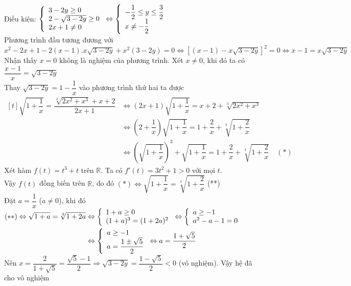 \lgi 
 Điều kiện: $\left\{\begin{array}{ll}3-2y\ge 0 \\ 2-\sqrt{3-2y}\ge 0 \\ 2x+1 \ne 0\end{array}\right. \Leftrightarrow \left\{\begin{array}{ll}-\dfrac{1}{2}\le y \le \dfrac{3}{2} \\ x\ne  -\dfrac{1}{2}\end{array}\right.$\\
 Phương trình đầu tương đương với\\
 $ x^2-2x+1-2(x-1).x\sqrt{3-2y}+x^2(3-2y)=0 \Leftrightarrow \left[(x-1)-x\sqrt{3-2y} \right]^2=0 \Leftrightarrow x-1=x\sqrt{3-2y} $\\
 Nhận thấy $x=0$ không là nghiệm của phương trình. Xét $x\ne 0$, khi đó ta có $\dfrac{x-1}{x}=\sqrt{3-2y}$\\
 Thay $\sqrt{3-2y}=1-\dfrac{1}{x}$ vào phương trình thứ hai ta được\\
$\begin{aligned}[t]\sqrt{1+\dfrac{1}{x}}=\dfrac{\sqrt[3]{2x^2+x^3}+x+2}{2x+1} &\Leftrightarrow (2x+1)\sqrt{1+\dfrac{1}{x}}=x+2+\sqrt[3]{2x^2+x^3} \\
&\Leftrightarrow \left(2+\dfrac{1}{x} \right)\sqrt{1+\dfrac{1}{x}}=1+\dfrac{2}{x}+\sqrt[3]{1+\dfrac{2}{x}} \\
&\Leftrightarrow \left(\sqrt{1+\dfrac{1}{x}} \right)^3+\sqrt{1+\dfrac{1}{x}}=1+\dfrac{2}{x}+\sqrt[3]{1+\dfrac{2}{x}} \quad (*)
\end{aligned}$\\
Xét hàm $f(t)=t^3+t$ trên $\mathbb{R}$. Ta có $f'(t)=3t^2+1>0$ với mọi $t$.\\
 Vậy $f(t)$ đồng biến trên $\mathbb{R}$, do đó $(*)\Leftrightarrow \sqrt{1+\dfrac{1}{x}}=\sqrt[3]{1+\dfrac{2}{x}}$ (**)\\
 Đặt $a=\dfrac{1}{x}$ ($a\ne 0$), khi đó\\ 
 $\begin{aligned}[t] (**)\Leftrightarrow \sqrt{1+a}=\sqrt[3]{1+2a}&\Leftrightarrow \left\{\begin{array}{ll}1+a\ge 0 \\ (1+a)^3=(1+2a)^2\end{array}\right.\Leftrightarrow \left\{\begin{array}{ll}a\ge -1 \\ a^2-a-1=0\end{array}\right. \\
&\Leftrightarrow \left\{\begin{array}{ll}a\ge -1 \\ a=\dfrac{1\pm \sqrt{5}}{2}\end{array}\right. \Leftrightarrow a=\dfrac{1+\sqrt{5}}{2}\end{aligned}$\\
 Nên $x=\dfrac{2}{1+\sqrt{5}}=\dfrac{\sqrt{5}-1}{2}\Rightarrow \sqrt{3-2y}=\dfrac{1-\sqrt{5}}{2}<0$ (vô nghiệm).
 Vậy hệ đã cho vô nghiệm

